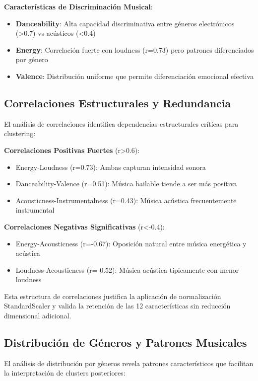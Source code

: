 \documentclass[12pt,a4paper]{report}
\begin{document}
\textbf{Características de Discriminación Musical}:
\begin{itemize}
\item \textbf{Danceability}: Alta capacidad discriminativa entre géneros electrónicos (>0.7) vs acústicos (<0.4)
\item \textbf{Energy}: Correlación fuerte con loudness (r=0.73) pero patrones diferenciados por género
\item \textbf{Valence}: Distribución uniforme que permite diferenciación emocional efectiva
\end{itemize}

\subsection{Correlaciones Estructurales y Redundancia}

El análisis de correlaciones identifica dependencias estructurales críticas para clustering:

\textbf{Correlaciones Positivas Fuertes} (r>0.6):
\begin{itemize}
\item Energy-Loudness (r=0.73): Ambas capturan intensidad sonora
\item Danceability-Valence (r=0.51): Música bailable tiende a ser más positiva
\item Acousticness-Instrumentalness (r=0.43): Música acústica frecuentemente instrumental
\end{itemize}

\textbf{Correlaciones Negativas Significativas} (r<-0.4):
\begin{itemize}
\item Energy-Acousticness (r=-0.67): Oposición natural entre música energética y acústica
\item Loudness-Acousticness (r=-0.52): Música acústica típicamente con menor loudness
\end{itemize}

Esta estructura de correlaciones justifica la aplicación de normalización StandardScaler y valida la retención de las 12 características sin reducción dimensional adicional.

\subsection{Distribución de Géneros y Patrones Musicales}

El análisis de distribución por géneros revela patrones característicos que facilitan la interpretación de clusters posteriores:
\end{document}
